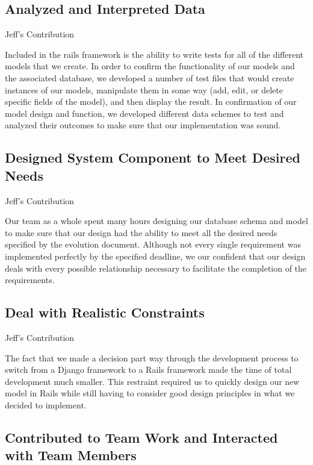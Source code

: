 \documentclass[11pt]{article}
\begin{document}
\subsection{Analyzed and Interpreted Data}

Jeff's Contribution

Included in the rails framework is the ability to write tests for all of the different models that we create.  In order to confirm the functionality of our models and the associated database, we developed a number of test files that would create instances of our models, manipulate them in some way (add, edit, or delete specific fields of the model), and then display the result.  In confirmation of our model design and function, we developed different data schemes to test and analyzed their outcomes to make sure that our implementation was sound.

\subsection{Designed System Component to Meet Desired Needs}

Jeff's Contribution

Our team as a whole spent many hours designing our database schema and model to make sure that our design had the ability to meet all the desired needs specified by the evolution document.  Although not every single requirement was implemented perfectly by the specified deadline, we our confident that our design deals with every possible relationship necessary to facilitate the completion of the requirements.

\subsection{Deal with Realistic Constraints}

Jeff's Contribution

The fact that we made a decision part way through the development process to switch from a Django framework to a Rails framework made the time of total development much smaller.  This restraint required us to quickly design our new model in Rails while still having to consider good design principles in what we decided to implement.

\subsection{Contributed to Team Work and Interacted with Team Members}
\end{document}
